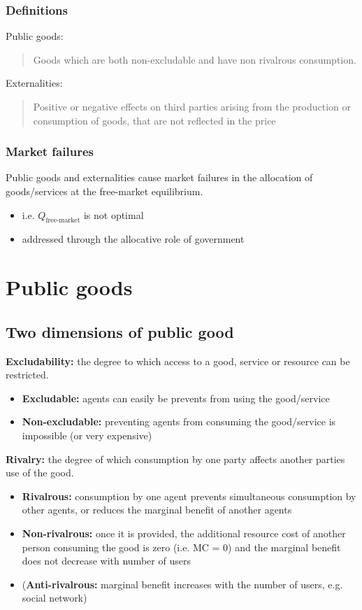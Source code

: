 \subsubsection{Definitions}
Public goods:
\begin{quote}
  Goods which are both non-excludable and have non rivalrous consumption.
\end{quote}
Externalities:
\begin{quote}
  Positive or negative effects on third parties arising from the production or consumption of goods, that are not reflected in the price
\end{quote}
\subsubsection{Market failures}
Public goods and externalities cause market failures in the allocation of goods/services at the free-market equilibrium.
\begin{itemize}
  \item i.e. $Q_{\textrm{free-market}}$ is not optimal
  \item addressed through the allocative role of government
\end{itemize}
\section{Public goods}
\subsection{Two dimensions of public good}
\textbf{Excludability:} the degree to which access to a good, service or resource can be restricted.
\begin{itemize}
  \item \textbf{Excludable:} agents can easily be prevents from using the good/service
  \item \textbf{Non-excludable:} preventing agents from consuming the good/service is impossible (or very expensive)
\end{itemize}
\textbf{Rivalry:} the degree of which consumption by one party affects another parties use of the good.
\begin{itemize}
  \item \textbf{Rivalrous:} consumption by one agent prevents simultaneous consumption by other agents, or reduces the marginal benefit of another agents
  \item \textbf{Non-rivalrous:} once it is provided, the additional resource cost of another person consuming the good is zero (i.e. MC = 0) and the marginal benefit does not decrease with number of users
  \item (\textbf{Anti-rivalrous:} marginal benefit increases with the number of users, e.g. social network)
\end{itemize}
